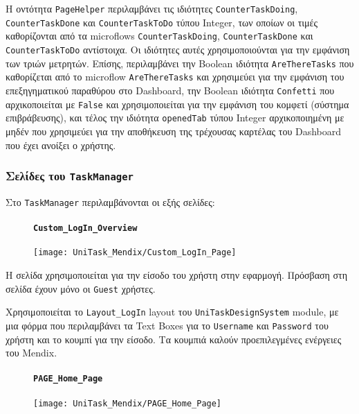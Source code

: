                 Η οντότητα \texttt{PageHelper} περιλαμβάνει τις ιδιότητες \texttt{CounterTaskDoing}, \linebreak \texttt{CounterTaskDone} και \texttt{CounterTaskToDo} τύπου Integer, των οποίων οι τιμές καθορίζονται από τα microflows \texttt{CounterTaskDoing}, \texttt{CounterTaskDone} και \texttt{CounterTaskToDo} αντίστοιχα. Οι ιδιότητες αυτές χρησιμοποιούνται για την εμφάνιση των τριών μετρητών. Επίσης, περιλαμβάνει την Boolean ιδιότητα \texttt{AreThereTasks} που καθορίζεται από το microflow \texttt{AreThereTasks} και χρησιμεύει για την εμφάνιση του επεξηγηματικού παραθύρου στο Dashboard, την Boolean ιδιότητα \texttt{Confetti} που αρχικοποιείται με \texttt{False} και χρησιμοποιείται για την εμφάνιση του κομφετί (σύστημα επιβράβευσης), και τέλος την ιδιότητα \texttt{openedTab} τύπου Integer αρχικοποιημένη με μηδέν που χρησιμεύει για την αποθήκευση της τρέχουσας καρτέλας του Dashboard που έχει ανοίξει ο χρήστης.

            \subsubsection{Σελίδες του \texttt{TaskManager}}
                Στο \texttt{TaskManager} περιλαμβάνονται οι εξής σελίδες:

                \begin{figure}[H] \noindent
                    \paragraph{\texttt{Custom\_LogIn\_Overview}}
                    \begin{center}
                        \texttt{[image: UniTask\_Mendix/Custom\_LogIn\_Page]}
                    \end{center}
                \end{figure}

                Η σελίδα χρησιμοποιείται για την είσοδο του χρήστη στην εφαρμογή. Πρόσβαση στη σελίδα έχουν μόνο οι \texttt{Guest} χρήστες.

                Χρησιμοποιείται το \texttt{Layout\_LogIn} layout του \texttt{UniTaskDesignSystem} module, με μια φόρμα που περιλαμβάνει τα Text Boxes για το \texttt{Username} και \texttt{Password} του χρήστη και το κουμπί για την είσοδο. Τα κουμπιά καλούν προεπιλεγμένες ενέργειες του Mendix.

                \begin{figure}[H] \noindent
                    \paragraph{\texttt{PAGE\_Home\_Page}}
                    \begin{center}
                        \texttt{[image: UniTask\_Mendix/PAGE\_Home\_Page]}
                    \end{center}
                \end{figure}


